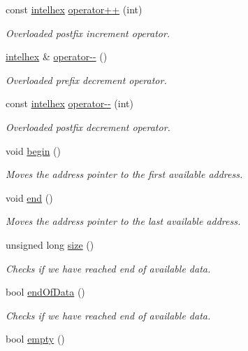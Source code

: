 \begin{DoxyCompactItemize}
const \hyperlink{classintelhex}{intelhex} \hyperlink{classintelhex_ab54337b9681fc0b50e3fdb18ed1714fa}{operator++} (int)
\begin{DoxyCompactList}\small\item\em Overloaded postfix increment operator. \end{DoxyCompactList}\item 
\hyperlink{classintelhex}{intelhex} \& \hyperlink{classintelhex_ab85cbeafe9cc6adcec79f1bc709addca}{operator-\/-\/} ()
\begin{DoxyCompactList}\small\item\em Overloaded prefix decrement operator. \end{DoxyCompactList}\item 
const \hyperlink{classintelhex}{intelhex} \hyperlink{classintelhex_a90562846d95b5573923f129b82aeceec}{operator-\/-\/} (int)
\begin{DoxyCompactList}\small\item\em Overloaded postfix decrement operator. \end{DoxyCompactList}\item 
void \hyperlink{classintelhex_ab2b1119e14a960ea2b356967244aafb3}{begin} ()
\begin{DoxyCompactList}\small\item\em Moves the address pointer to the first available address. \end{DoxyCompactList}\item 
void \hyperlink{classintelhex_a7759926596cfcffec94e391fff4298e9}{end} ()
\begin{DoxyCompactList}\small\item\em Moves the address pointer to the last available address. \end{DoxyCompactList}\item 
unsigned long \hyperlink{classintelhex_afa757932ec420f977d33bb9a2d5a0a69}{size} ()
\begin{DoxyCompactList}\small\item\em Checks if we have reached end of available data. \end{DoxyCompactList}\item 
bool \hyperlink{classintelhex_aff915b320f5a4c2d84340fa57c99499c}{end\-Of\-Data} ()
\begin{DoxyCompactList}\small\item\em Checks if we have reached end of available data. \end{DoxyCompactList}\item 
bool \hyperlink{classintelhex_a2bd5b567207303d4d9f4322e6262d6d6}{empty} ()

\end{DoxyCompactItemize}
